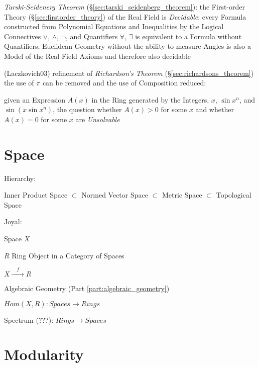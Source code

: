 \emph{Tarski-Seidenerg Theorem} (\S\ref{sec:tarski_seidenberg_theorem}): the
First-order Theory (\S\ref{sec:firstorder_theory}) of the Real Field is
\emph{Decidable}: every Formula constructed from Polynomial Equations and
Inequalities by the Logical Connectives $\vee$, $\wedge$, $\neg$, and
Quantifiers $\forall$, $\exists$ is equivalent to a Formula without
Quantifiers; Euclidean Geometry without the ability to measure Angles is also a
Model of the Real Field Axioms and therefore also decidable

(Laczkovich03) refinement of \emph{Richardson's Theorem}
(\S\ref{sec:richardsons_theorem}) the use of $\pi$ can be removed and the use
of Composition reduced:

given an Expression $A(x)$ in the Ring generated by the Integers, $x$, $\sin
x^n$, and $\sin(x \sin x^n)$, the question whether $A(x) > 0$ for some $x$ and
whether $A(x) = 0$ for some $x$ are \emph{Unsolvable}



\section{Space}\label{sec:space}

Hierarchy:

Inner Product Space \newline
$\subset$ Normed Vector Space \newline
$\subset$ Metric Space \newline
$\subset$ Topological Space

Joyal: %

Space $X$

$R$ Ring Object in a Category of Spaces

$X \xrightarrow{\quad f \quad} R$

Algebraic Geometry (Part \ref{part:algebraic_geometry})

$Hom(X,R) : Spaces \rightarrow Rings$

Spectrum (???): $Rings \rightarrow Spaces$



\section{Modularity}\label{sec:modularity}

